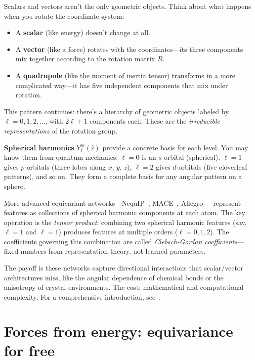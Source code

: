 \documentclass[11pt]{article}
\begin{document}
\begin{sciencebox}
Scalars and vectors aren't the only geometric objects. Think about what happens when you rotate the coordinate system:
\begin{itemize}
\item A \textbf{scalar} (like energy) doesn't change at all.
\item A \textbf{vector} (like a force) rotates with the coordinates---its three components mix together according to the rotation matrix $R$.
\item A \textbf{quadrupole} (like the moment of inertia tensor) transforms in a more complicated way---it has five independent components that mix under rotation.
\end{itemize}
This pattern continues: there's a hierarchy of geometric objects labeled by $\ell = 0, 1, 2, \ldots$, with $2\ell + 1$ components each. These are the \emph{irreducible representations} of the rotation group.

\textbf{Spherical harmonics} $Y_\ell^m(\hat{r})$ provide a concrete basis for each level. You may know them from quantum mechanics: $\ell = 0$ is an $s$-orbital (spherical), $\ell = 1$ gives $p$-orbitals (three lobes along $x$, $y$, $z$), $\ell = 2$ gives $d$-orbitals (five cloverleaf patterns), and so on. They form a complete basis for any angular pattern on a sphere.

More advanced equivariant networks---NequIP~\cite{batzner2022nequip}, MACE~\cite{batatia2022mace}, Allegro~\cite{musaelian2023allegro}---represent features as collections of spherical harmonic components at each atom. The key operation is the \emph{tensor product}: combining two spherical harmonic features (say, $\ell = 1$ and $\ell = 1$) produces features at multiple orders ($\ell = 0, 1, 2$). The coefficients governing this combination are called \emph{Clebsch-Gordan coefficients}---fixed numbers from representation theory, not learned parameters.

The payoff is these networks capture directional interactions that scalar/vector architectures miss, like the angular dependence of chemical bonds or the anisotropy of crystal environments. The cost: mathematical and computational complexity. For a comprehensive introduction, see~\cite{duval2023hitchhiker}.
\end{sciencebox}

\section{Forces from energy: equivariance for free}
\end{document}
